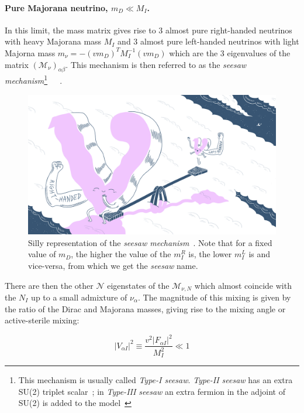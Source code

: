 \paragraph {Pure Majorana neutrino, $m_D \ll M_I$.}
In this limit, the mass matrix gives rise to 3 almost pure right-handed neutrinos with heavy Majorana mass $M_I$ and 3 almost pure left-handed neutrinos with light Majorna mass $m_\nu = - (vm_D)^{T}M^{-1}_{I}(vm_D)$ which are the 3 eigenvalues of the matrix $(\mathcal{M}_{\nu})_{\alpha \beta}$. This mechanism is then referred to as the \emph{seesaw mechanism}\footnote{This mechanism is usually called \emph{Type-I seesaw}. \emph{Type-II seesaw} has an extra SU(2) triplet scalar~\cite{Deppisch_2015}; in \emph{Type-III seesaw} an extra fermion in the adjoint of SU(2) is added to the model~\cite{Foot:1988aq}}~\cite{MINKOWSKI1977421}~\cite{Mohapatra:1979ia}~\cite{Yanagida:1979as}.
\begin{figure}[h!]
  \centering
  \includegraphics[width=.60\textwidth]{Figures/c3/funny.png}
    \caption{Silly representation of the \emph{seesaw mechanism}~\cite{funny}. Note that for a fixed value of $m_D$, the higher the value of the $m^{R}_I$ is, the lower $m^{L}_I$ is and vice-versa, from which we get the \emph{seesaw} name.}
  \label{fig:c3funny}
\end{figure}
There are then the other $\mathcal{N}$ eigenstates of the $\mathcal{M}_{\nu,N}$ which almost coincide with the $N_I$ up to a small admixture of $\nu_\alpha$.
The magnitude of this mixing is given by the ratio of the Dirac and Majorana masses, giving rise to the mixing angle or active-sterile mixing:

\begin{equation}
\label{eq:v2}
 |V_{\alpha I} |^{2}\equiv \frac{v^{2}|F_{\alpha I}|^2}{M^{2}_{I}} \ll 1
\end{equation}

